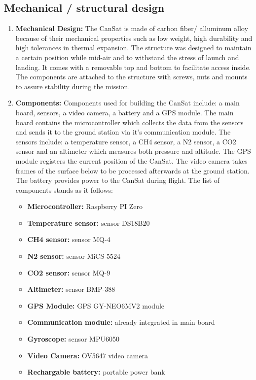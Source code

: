 \documentclass[11pt]{article}
\begin{document}
\subsection{Mechanical / structural design}
\begin{enumerate}
\item \textbf{Mechanical Design:} The CanSat is made of carbon fiber/ alluminum alloy because of their mechanical properties such as low weight, high durability and high tolerances in thermal expansion. The structure was designed to maintain a certain position while mid-air and to withstand the stress of launch and landing. It comes with a removable top and bottom to facilitate access inside. The components are attached to the structure with screws, nuts and mounts to assure stability during the mission.
\vspace{0.25cm}
\item \textbf{Components:} Components used for building the CanSat include: a main board, sensors, a video camera, a battery and a GPS module. The main board contains the microcontroller which collects the data from the sensors and sends it to the ground station via it’s communication module. The sensors include: a temperature sensor, a CH4 sensor, a N2 sensor, a CO2 sensor and an altimeter which measures both pressure and altitude. The GPS module registers the current position of the CanSat. The video camera takes frames of the surface below to be processed afterwards at the ground station. The battery provides power to the CanSat during flight. The list of components stands as it follows:

\begin{itemize}
\item \textbf{Microcontroller:} Raspberry PI Zero
\item \textbf{Temperature sensor:} sensor DS18B20
\item \textbf{CH4 sensor:} sensor MQ-4
\item \textbf{N2 sensor:} sensor MiCS-5524
\item \textbf{CO2 sensor:} sensor MQ-9
\item \textbf{Altimeter:} sensor BMP-388
\item \textbf{GPS Module:} GPS GY-NEO6MV2 module
\item \textbf{Communication module:} already integrated in main board
\item \textbf{Gyroscope:} sensor MPU6050
\item \textbf{Video Camera:} OV5647 video camera
\item \textbf{Rechargable battery:} portable power bank
\end{itemize}


\end{enumerate}
\end{document}
